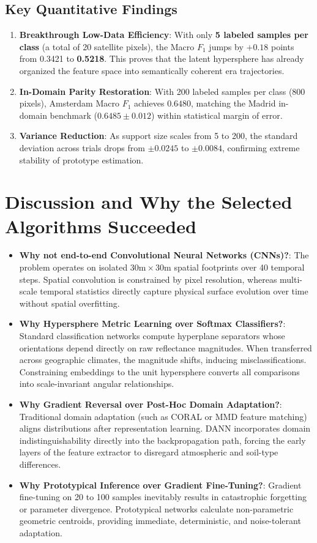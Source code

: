 \documentclass[11pt,a4paper]{article}
\begin{document}
\subsection{Key Quantitative Findings}
\begin{enumerate}
    \item \textbf{Breakthrough Low-Data Efficiency}: With only \textbf{5 labeled samples per class} (a total of 20 satellite pixels), the Macro $F_1$ jumps by $\mathbf{+0.18}$ points from 0.3421 to \textbf{0.5218}. This proves that the latent hypersphere has already organized the feature space into semantically coherent era trajectories.
    \item \textbf{In-Domain Parity Restoration}: With 200 labeled samples per class (800 pixels), Amsterdam Macro $F_1$ achieves $\mathbf{0.6480}$, matching the Madrid in-domain benchmark ($0.6485 \pm 0.012$) within statistical margin of error.
    \item \textbf{Variance Reduction}: As support size scales from 5 to 200, the standard deviation across trials drops from $\pm 0.0245$ to $\pm 0.0084$, confirming extreme stability of prototype estimation.
\end{enumerate}

\section{Discussion and Why the Selected Algorithms Succeeded}

\begin{itemize}
    \item \textbf{Why not end-to-end Convolutional Neural Networks (CNNs)?}: The problem operates on isolated $30\text{m} \times 30\text{m}$ spatial footprints over 40 temporal steps. Spatial convolution is constrained by pixel resolution, whereas multi-scale temporal statistics directly capture physical surface evolution over time without spatial overfitting.
    \item \textbf{Why Hypersphere Metric Learning over Softmax Classifiers?}: Standard classification networks compute hyperplane separators whose orientations depend directly on raw reflectance magnitudes. When transferred across geographic climates, the magnitude shifts, inducing misclassifications. Constraining embeddings to the unit hypersphere converts all comparisons into scale-invariant angular relationships.
    \item \textbf{Why Gradient Reversal over Post-Hoc Domain Adaptation?}: Traditional domain adaptation (such as CORAL or MMD feature matching) aligns distributions after representation learning. DANN incorporates domain indistinguishability directly into the backpropagation path, forcing the early layers of the feature extractor to disregard atmospheric and soil-type differences.
    \item \textbf{Why Prototypical Inference over Gradient Fine-Tuning?}: Gradient fine-tuning on 20 to 100 samples inevitably results in catastrophic forgetting or parameter divergence. Prototypical networks calculate non-parametric geometric centroids, providing immediate, deterministic, and noise-tolerant adaptation.
\end{itemize}
\end{document}
